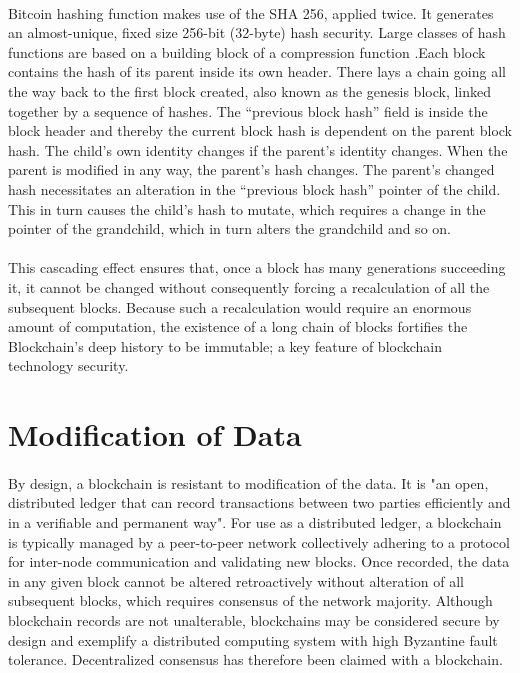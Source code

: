  \paragraph{}Bitcoin hashing function makes use of the SHA 256, applied twice. It generates an almost-unique, fixed size 256-bit (32-byte) hash security. Large classes of hash functions are based on a building block of a compression function .Each block contains the hash of its parent inside its own header. There lays a chain going all the way back to the first block created, also known as the genesis block, linked together by a sequence of hashes. The “previous block hash” field is inside the block header and thereby the current block hash is dependent on the parent block hash. The child’s own identity changes if the parent’s identity changes. When the parent is modified in any way, the parent’s hash changes. The parent’s changed hash necessitates an alteration in the “previous block hash” pointer of the child. This in turn causes the child’s hash to mutate, which requires a change in the pointer of the grandchild, which in turn alters the grandchild and so on.
 
\paragraph{}This cascading effect ensures that, once a block has many generations succeeding it, it cannot be changed without consequently forcing a recalculation of all the subsequent blocks. Because such a recalculation would require an enormous amount of computation, the existence of a long chain of blocks fortifies the Blockchain’s deep history to be immutable; a key feature of blockchain technology security.

\section{Modification of Data}
\paragraph{}By design, a blockchain is resistant to modification of the data. It is "an open, distributed ledger that can record transactions between two parties efficiently and in a verifiable and permanent way". For use as a distributed ledger, a blockchain is typically managed by a peer-to-peer network collectively adhering to a protocol for inter-node communication and validating new blocks. Once recorded, the data in any given block cannot be altered retroactively without alteration of all subsequent blocks, which requires consensus of the network majority. Although blockchain records are not unalterable, blockchains may be considered secure by design and exemplify a distributed computing system with high Byzantine fault tolerance. Decentralized consensus has therefore been claimed with a blockchain.

